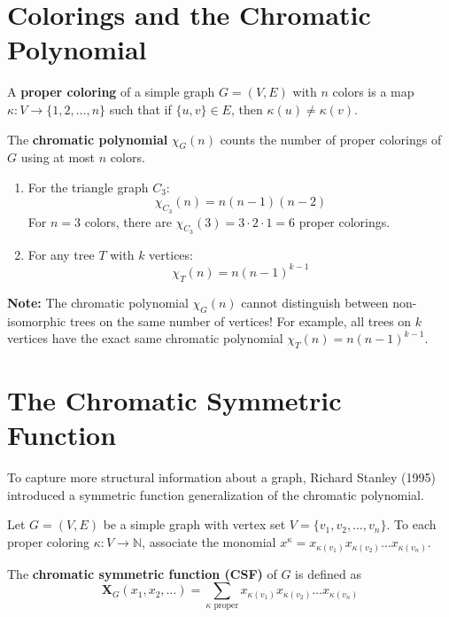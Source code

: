 \documentclass[12pt]{memoir}
\begin{document}
\newpage

\section{Colorings and the Chromatic Polynomial}

\begin{ptcb}
\begin{Def}
A \textbf{proper coloring} of a simple graph $G = (V, E)$ with $n$ colors is a map $\kappa: V \to \{1, 2, \dots, n\}$ such that if $\{u, v\} \in E$, then $\kappa(u) \neq \kappa(v)$.
\end{Def}
\end{ptcb}

\begin{ptcb}
\begin{Def}
The \textbf{chromatic polynomial} $\chi_G(n)$ counts the number of proper colorings of $G$ using at most $n$ colors.
\end{Def}
\end{ptcb}

\begin{Ex}
\begin{enumerate}
    \item For the triangle graph $C_3$:
    \[
    \chi_{C_3}(n) = n(n-1)(n-2)
    \]
    For $n=3$ colors, there are $\chi_{C_3}(3) = 3 \cdot 2 \cdot 1 = 6$ proper colorings.
    \item For any tree $T$ with $k$ vertices:
    \[
    \chi_T(n) = n(n-1)^{k-1}
    \]
\end{enumerate}
\end{Ex}

\textbf{Note:} The chromatic polynomial $\chi_G(n)$ cannot distinguish between non-isomorphic trees on the same number of vertices! For example, all trees on $k$ vertices have the exact same chromatic polynomial $\chi_T(n) = n(n-1)^{k-1}$.

\newpage

\section{The Chromatic Symmetric Function}

To capture more structural information about a graph, Richard Stanley (1995) introduced a symmetric function generalization of the chromatic polynomial.

\begin{ptcb}
\begin{Def}[Stanley, 1995]
Let $G = (V, E)$ be a simple graph with vertex set $V = \{v_1, v_2, \dots, v_n\}$. To each proper coloring $\kappa: V \to \mathbb{N}$, associate the monomial $x^\kappa = x_{\kappa(v_1)} x_{\kappa(v_2)} \dots x_{\kappa(v_n)}$.

The \textbf{chromatic symmetric function (CSF)} of $G$ is defined as
\[
\mathbf{X}_G(x_1, x_2, \dots) = \sum_{\kappa \text{ proper}} x_{\kappa(v_1)} x_{\kappa(v_2)} \dots x_{\kappa(v_n)}
\]
\end{Def}
\end{ptcb}
\end{document}
